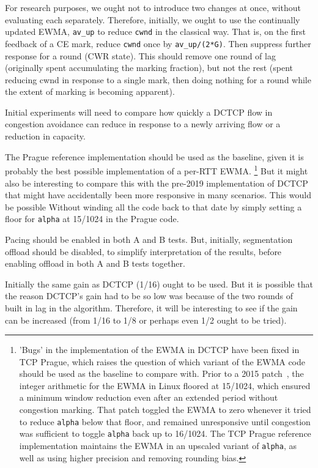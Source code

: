 For research purposes, we ought not to introduce two changes at once, without
evaluating each separately. Therefore, initially, we ought to use the
continually updated EWMA, \texttt{av\_up} to reduce \texttt{cwnd} in the
classical way. That is, on the first feedback of a CE mark, reduce \texttt{cwnd}
once by \texttt{av\_up/(2*G)}. Then suppress further response for a round (CWR
state). This should remove one round of lag (originally spent accumulating the
marking fraction), but not the rest (spent reducing cwnd in response to a single
mark, then doing nothing for a round while the extent of marking is becoming
apparent).

Initial experiments will need to compare how quickly a DCTCP flow in congestion
avoidance can reduce in response to a newly arriving flow or a reduction in
capacity.

The Prague reference implementation should be used as the baseline, given it is
probably the best possible implementation of a per-RTT EWMA.%
%
\footnote{'Bugs' in the implementation of the EWMA in DCTCP have been fixed in
	TCP Prague, which raises the question of which variant of the EWMA code should
	be used as the baseline to compare with. Prior to a 2015
	patch~\cite{shewmaker15:Linux_DCTCP_EWMA}, the integer arithmetic for the EWMA
	in Linux floored at 15/1024, which ensured a minimum window reduction even after
	an extended period without congestion marking. That patch toggled the EWMA to
	zero whenever it tried to reduce \texttt{alpha} below that floor, and remained
	unresponsive until congestion was sufficient to toggle \texttt{alpha} back up to
	16/1024. The TCP Prague reference implementation maintains the EWMA in an
	upscaled variant of \texttt{alpha}, as well as using higher precision and
	removing rounding bias.}%
%
But it might also be interesting to compare this with the pre-2019
implementation of DCTCP that might have accidentally been more responsive in
many scenarios. This would be possible Without winding all the code back to that
date by simply setting a floor for \texttt{alpha} at 15/1024 in the Prague code.

Pacing should be enabled in both A and B tests. But, initially, segmentation
offload should be disabled, to simplify interpretation of the results, before
enabling offload in both A and B tests together.

Initially the same gain as DCTCP (1/16) ought to be used. But it is possible
that the reason DCTCP's gain had to be so low was because of the two rounds of
built in lag in the algorithm. Therefore, it will be interesting to see if the
gain can be increased (from 1/16 to 1/8 or perhaps even 1/2 ought to be tried).

